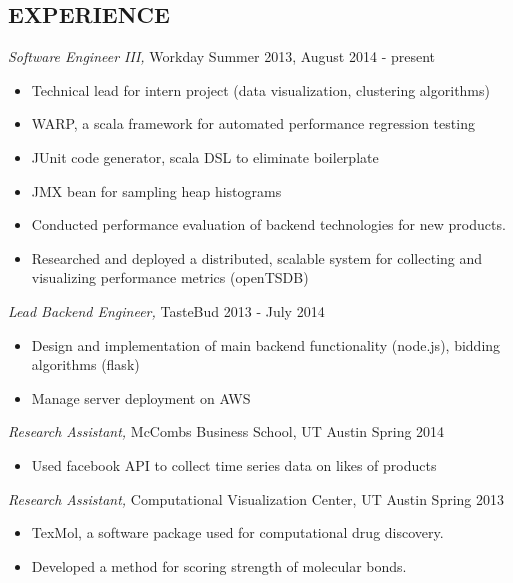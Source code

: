 \documentclass[line,margin]{res}
\begin{document}
\begin{resume}
    \section{EXPERIENCE} {\sl Software Engineer III, } Workday \hfill Summer 2013, August 2014 - present
                 \begin{itemize}  \itemsep -2pt %
                         \item Technical lead for intern project (data visualization, clustering algorithms)
                 \item WARP, a scala framework for automated performance regression testing
                 \item JUnit code generator, scala DSL to eliminate boilerplate
                 \item JMX bean for sampling heap histograms    
                 \item Conducted performance evaluation of backend technologies for new products.
                 \item Researched and deployed a distributed, scalable system for collecting and visualizing performance metrics (openTSDB)
                 \end{itemize}


                {\sl Lead Backend Engineer, } TasteBud \hfill 2013 - July 2014
                 \begin{itemize}  \itemsep -2pt %
                         \item Design and implementation of main backend functionality (node.js), bidding algorithms (flask)
                 \item Manage server deployment on AWS    
                 \end{itemize}

                {\sl Research Assistant, } McCombs Business School, UT Austin \hfill Spring 2014
                \begin{itemize} \itemsep -2pt
                    \item Used facebook API to collect time series data on likes of products
                 \end{itemize}

                {\sl Research Assistant, } Computational Visualization Center, UT Austin \hfill Spring 2013
                \begin{itemize} \itemsep -2pt
                    \item TexMol, a software package used for computational drug discovery.
                    \item Developed a method for scoring strength of molecular bonds.
                 \end{itemize}
        

\end{resume}
\end{document}
